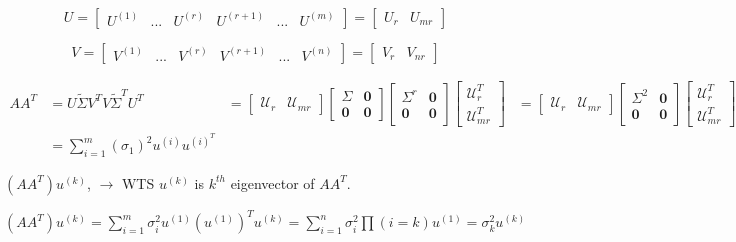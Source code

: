 $$ U =   
\left[
\begin{matrix}
U^{(1)} & ... & U^{(r)} & U^{(r+1)} & ... & U^{(m)}
\end{matrix}
\right] =
\left[
\begin{matrix}
U_r & U_{mr}
\end{matrix}
\right]
$$


$$ V =   
\left[
\begin{matrix}
V^{(1)} & ... & V^{(r)} & V^{(r+1)} & ... & V^{(n)}
\end{matrix}
\right] =
\left[
\begin{matrix}
V_r & V_{nr}
\end{matrix}
\right]
$$




\begin{align*}
AA^T &= U\tilde{\Sigma} V^TV\tilde{\Sigma}^TU^T
&=
\begin{bmatrix}
\mathcal{U}_r & \mathcal{U}_{mr}
\end{bmatrix}
\begin{bmatrix}
\Sigma & \textbf{0}\\
\textbf{0}&\textbf{0}
\end{bmatrix}
\begin{bmatrix}
\Sigma^r & \textbf{0}\\
\textbf{0}&\textbf{0}
\end{bmatrix}
\begin{bmatrix}
\mathcal{U}_r^T\\
\mathcal{U}_{mr}^T
\end{bmatrix}
&=
\begin{bmatrix}
\mathcal{U}_r & \mathcal{U}_{mr}
\end{bmatrix}
\begin{bmatrix}
\Sigma^2 & \textbf{0}\\
\textbf{0}&\textbf{0}
\end{bmatrix}
\begin{bmatrix}
\mathcal{U}_r^T\\
\mathcal{U}_{mr}^T
\end{bmatrix}
&= \sum^r_{i=1}(\sigma_i)^2u^{(i)}(u&{(i)})^T\\
&= \sum^m_{i=1}(\sigma_1)^2u^{(i)}u^{(i)^T}
\end{align*}



$(AA^T)u^{(k)}$, $\rightarrow$ WTS $u^{(k)}$ is $k^{th}$ eigenvector of $AA^T$. 

$(AA^T)u^{(k)} = \sum^m_{i=1}\sigma_i^2u^{(1)}(u^{(1)})^Tu^{(k)} = \sum^n_{i=1}\sigma_i^2\prod(i=k)u^{(1)} =\sigma^2_ku^{(k)}$

